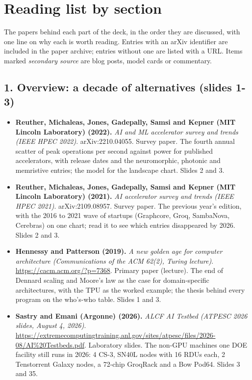 \section*{Reading list by section}
The papers behind each part of the deck, in the order they are discussed, with one line on why each is worth reading. Entries with an arXiv identifier are included in the paper archive; entries without one are listed with a URL. Items marked \emph{secondary source} are blog posts, model cards or commentary.

\subsection*{1. Overview: a decade of alternatives (slides 1-3)}
\begin{itemize}[leftmargin=1.2em,itemsep=3pt]\sloppy
\item \textbf{Reuther, Michaleas, Jones, Gadepally, Samsi and Kepner (MIT Lincoln Laboratory) (2022).} \textit{AI and ML accelerator survey and trends (IEEE HPEC 2022)}. arXiv:2210.04055. Survey paper. The fourth annual scatter of peak operations per second against power for published accelerators, with release dates and the neuromorphic, photonic and memristive entries; the model for the landscape chart. Slides 2 and 3.
\item \textbf{Reuther, Michaleas, Jones, Gadepally, Samsi and Kepner (MIT Lincoln Laboratory) (2021).} \textit{AI accelerator survey and trends (IEEE HPEC 2021)}. arXiv:2109.08957. Survey paper. The previous year's edition, with the 2016 to 2021 wave of startups (Graphcore, Groq, SambaNova, Cerebras) on one chart; read it to see which entries disappeared by 2026. Slides 2 and 3.
\item \textbf{Hennessy and Patterson (2019).} \textit{A new golden age for computer architecture (Communications of the ACM 62(2), Turing lecture)}. \url{https://cacm.acm.org/?p=7368}. Primary paper (lecture). The end of Dennard scaling and Moore's law as the case for domain-specific architectures, with the TPU as the worked example; the thesis behind every program on the who's-who table. Slides 1 and 3.
\item \textbf{Sastry and Emani (Argonne) (2026).} \textit{ALCF AI Testbed (ATPESC 2026 slides, August 4, 2026)}. \url{https://extremecomputingtraining.anl.gov/sites/atpesc/files/2026-08/AI%20Testbeds.pdf}. Laboratory slides. The non-GPU machines one DOE facility still runs in 2026: 4 CS-3, SN40L nodes with 16 RDUs each, 2 Tenstorrent Galaxy nodes, a 72-chip GroqRack and a Bow Pod64. Slides 3 and 35.

\end{itemize}
